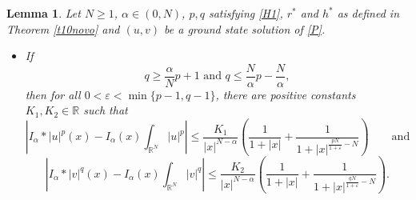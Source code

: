 \documentclass[12pt,a4paper]{article}
\newtheorem{lemma}[theorem]{Lemma}
\numberwithin{equation}{section}
\begin{document}
\begin{lemma}\label{decaimento}
Let $N\geq 1$, $\alpha\in (0, N)$, $p, q$ satisfying \eqref{H1}, $r^\ast$ and $h^\ast$ as defined in Theorem \ref{t10novo} and $(u, v)$ be a ground state solution of \eqref{P}.
\begin{itemize}
    \item[(a)] If 
    $$
    q \geq \dfrac{\alpha}{N}p + 1 \mbox{ \ \ \ and \ \ \ } q \leq \dfrac{N}{\alpha}p - \dfrac{N}{\alpha},
    $$
    then for all $0<\varepsilon < \min\{p-1, q-1\}$, there are positive constants $K_1, K_2\in \mathbb{R}$ such that 
    \begin{equation}\label{decnuc1}
        \left| I_\alpha\ast |u|^p(x)-I_\alpha(x)\int_{\mathbb{R}^N} |u|^p \right| \leq \dfrac{K_1}{|x|^{N-\alpha}}\left(\dfrac{1}{1+|x|}+\dfrac{1}{1+|x|^{\frac{pN}{1+\varepsilon}-N}}\right) \qquad \text{and}
    \end{equation} 
    \begin{equation}\label{decnuc2}
      \left| I_\alpha\ast |v|^q(x)-I_\alpha(x)\int_{\mathbb{R}^N} |v|^q \right| \leq \dfrac{K_2}{|x|^{N-\alpha}}\left(\dfrac{1}{1+|x|}+\dfrac{1}{1+|x|^{\frac{qN}{1+\varepsilon}-N}}\right).  
    \end{equation}
    


\end{itemize}
\end{lemma}
\end{document}

